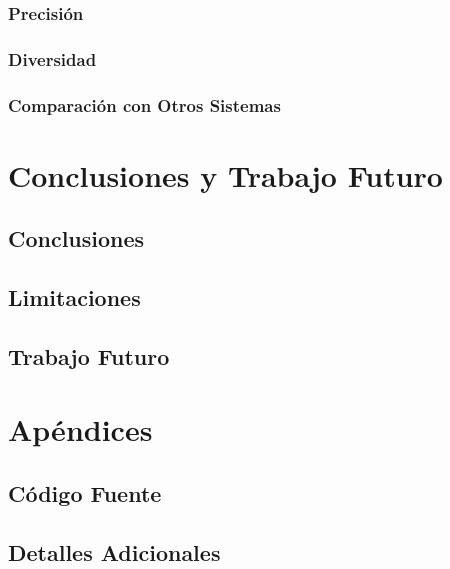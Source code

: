 \documentclass[a4paper,12pt]{report}
\begin{document}
\subsection{Precisión}
\subsection{Diversidad}
\subsection{Comparación con Otros Sistemas}

\chapter{Conclusiones y Trabajo Futuro}
\section{Conclusiones}
\section{Limitaciones}
\section{Trabajo Futuro}

\appendix
\chapter{Apéndices}
\section{Código Fuente}
\section{Detalles Adicionales}





\end{document}
